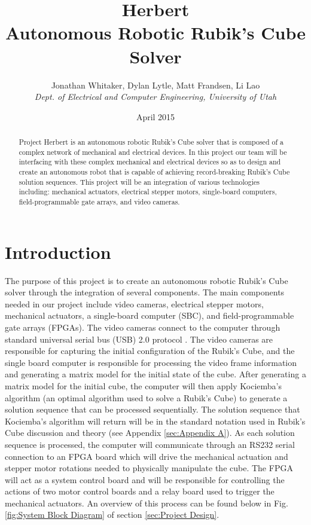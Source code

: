 \documentclass[final, letterpaper, 10 pt, conference, onecolumn]{IEEEtran}
\title{Herbert\\Autonomous Robotic Rubik's Cube Solver}
\author{
    Jonathan Whitaker, Dylan Lytle, Matt Frandsen, Li Lao\\
    \textit{Dept. of Electrical and Computer Engineering, University of Utah}\\
}
\date{April 2015}
\begin{document}
\maketitle

\begin{abstract}
Project Herbert is an autonomous robotic Rubik's Cube solver that is composed of a complex network of mechanical and electrical devices. In this project our team will be interfacing with these complex mechanical and electrical devices so as to design and create an autonomous robot that is capable of achieving record-breaking Rubik's Cube solution sequences.  This project will be an integration of various technologies including: mechanical actuators, electrical stepper motors, single-board computers, field-programmable gate arrays, and video cameras.
\end{abstract}

\section{Introduction}
\label{sec:intro}
The purpose of this project is to create an autonomous robotic Rubik's Cube solver through the integration of several components. The main components needed in our project include video cameras, electrical stepper motors, mechanical actuators, a single-board computer (SBC), and field-programmable gate arrays (FPGAs). The video cameras connect to the computer through standard universal serial bus (USB) 2.0 protocol \cite{USB 2.0}. The video cameras are responsible for capturing the initial configuration of the Rubik's Cube, and the single board computer is responsible for processing the video frame information and generating a matrix model for the initial state of the cube. After generating a matrix model for the initial cube, the computer will then apply Kociemba's algorithm \cite{Kociemba} (an optimal algorithm used to solve a Rubik's Cube) to generate a solution sequence that can be processed sequentially. The solution sequence that Kociemba's algorithm will return will be in the standard notation used in Rubik's Cube discussion and theory (see Appendix \ref{sec:Appendix A}). As each solution sequence is processed, the computer will communicate through an RS232 serial connection to an FPGA board which will drive the mechanical actuation and stepper motor rotations needed to physically manipulate the cube. The FPGA will act as a system control board and will be responsible for controlling the actions of two motor control boards and a relay board used to trigger the mechanical actuators. An overview of this process can be found below in Fig. \ref{fig:System Block Diagram} of section \ref{sec:Project Design}.
\end{document}
